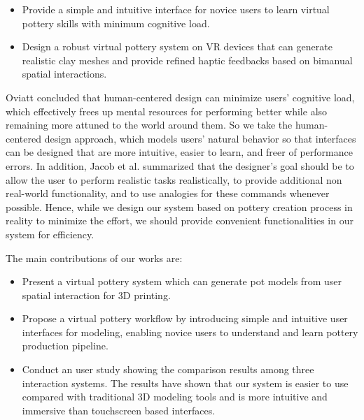 \begin{itemize}
\item Provide a simple and intuitive interface for novice users to learn virtual pottery skills with minimum cognitive load.
\item Design a robust virtual pottery system on VR devices that can generate realistic clay meshes and provide refined haptic feedbacks based on bimanual spatial interactions.
\end{itemize}

Oviatt \cite{oviatt2006human} concluded that human-centered design can minimize users’ cognitive load, which effectively frees up mental resources for performing better while also remaining more attuned to the world around them.
So we take the human-centered design approach, which models users’ natural behavior so that interfaces can be designed that are more intuitive, easier to learn, and freer of performance errors.
In addition, Jacob et al. \cite{Jacob2008Reality} summarized that the designer's goal should be to allow the user to perform realistic tasks realistically, to provide additional non real-world functionality, and to use analogies for these commands whenever possible.
Hence, while we design our system based on pottery creation process in reality to minimize the effort, we should provide convenient functionalities in our system for efficiency.

The main contributions of our works are:

\begin{itemize}
\item Present a virtual pottery system which can generate pot models from user spatial interaction for 3D printing.
\item Propose a virtual pottery workflow by introducing simple and intuitive user interfaces for modeling, enabling novice users to understand and learn pottery production pipeline.
\item Conduct an user study showing the comparison results among three interaction systems. The results have shown that our system is easier to use compared with traditional 3D modeling tools and is more intuitive and immersive than touchscreen based interfaces.
\end{itemize}

